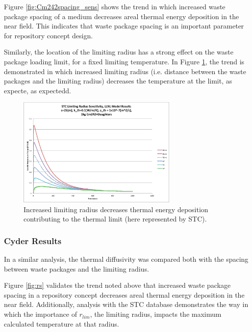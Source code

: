 Figure \ref{fig:Cm242spacing_sens} shows the trend in which increased waste package spacing of a medium decreases areal thermal energy 
deposition in the near field. This indicates that waste package spacing is 
an important parameter for repository concept design.

Similarly, the location of the limiting radius has a strong effect on the 
waste package loading limit, for a fixed limiting temperature. In Figure 
\ref{fig:Cm242r_lim_sens}, the trend is demonstrated in which increased limiting 
radius (i.e. distance between the waste packages and the limiting radius) 
decreases the temperature at the limit, as expecte, as expectedd.


\begin{figure}[htbp!]
\begin{center}
\includegraphics[width=0.7\textwidth]{./chapters/demonstration/spacing/Cm242r_lim_sens.eps}
\end{center}
\caption[Thermal Sensitivity to $r_{lim}$ and $s$]{Increased limiting radius 
decreases thermal energy deposition contributing to the thermal limit
(here represented by \gls{STC}).}
\label{fig:Cm242r_lim_sens}
\end{figure}


\FloatBarrier
\subsubsection{Cyder Results}

In a similar analysis, the thermal diffusivity was compared both with the 
spacing between waste packages and the limiting radius. 

Figure \ref{fig:rs} validates the trend noted above that 
increased waste package spacing in a repository concept decreases areal thermal energy deposition 
in the near field.  Additionally, analysis with the \Cyder STC database 
demonstrates the way in which the importance of $r_{lim}$, the limiting radius, 
impacts the maximum calculated temperature at that radius. 


